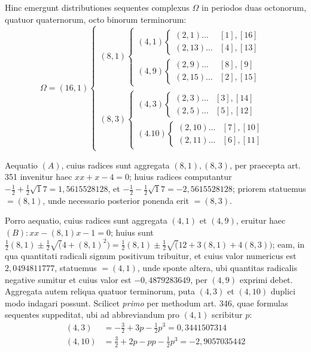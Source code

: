 Hinc emergunt distributiones sequentes complexus \(\Omega\) in periodos duas octonorum, quatuor quaternorum, octo binorum terminorum: {\small\setlength{\arraycolsep}{2pt}\[\Omega=(16,1)\left\{\begin{array}{l}(8,1)\left\{\begin{array}{l}(4,1)\left\{\begin{array}{ll}(2,1)\ldots&[1],[16]\\(2,13)\ldots&[4],[13]\end{array}\right.\\[4pt](4,9)\left\{\begin{array}{ll}(2,9)\ldots&[8],[9]\\(2,15)\ldots&[2],[15]\end{array}\right.\end{array}\right.\\[8pt](8,3)\left\{\begin{array}{l}(4,3)\left\{\begin{array}{ll}(2,3)\ldots&[3],[14]\\(2,5)\ldots&[5],[12]\end{array}\right.\\[4pt](4.10)\left\{\begin{array}{ll}(2,10)\ldots&[7],[10]\\(2,11)\ldots&[6],[11]\end{array}\right.\end{array}\right.\end{array}\right.\]}

Aequatio \((A)\), cuius radices sunt aggregata \((8,1),\allowbreak (8,3)\), per praecepta art. 351 invenitur haec \(xx+x-4=0\); huius radices computantur \(-\frac12+\frac12\surd 17=1{,}5615528128\), et \(-\frac12-\frac12\surd 17=-2{,}5615528128\); priorem statuemus \(=(8,1)\), unde necessario posterior ponenda erit \(=(8,3)\).

Porro aequatio, cuius radices sunt aggregata \((4,1)\) et \((4,9)\), eruitur haec \((B):xx-(8,1)x-1=0\); huius sunt \(\frac12(8,1)\pm\frac12\surd(4+(8,1)^2)=\frac12(8,1)\pm\frac12\surd(12+3(8,1)+4(8,3))\); eam, in qua quantitati radicali signum positivum tribuitur, et cuius valor numericus est \(2{,}0494811777\), statuemus \(=(4,1)\), unde sponte altera, ubi quantitas radicalis negative sumitur et cuius valor est \(-0{,}4879283649\), per \((4,9)\) exprimi debet. Aggregata autem reliqua quatuor terminorum, puta \((4,3)\) et \((4,10)\) duplici modo indagari possunt. Scilicet \textit{primo} per methodum art. 346, quae formulas sequentes suppeditat, ubi ad abbreviandum pro \((4,1)\) scribitur \(p\): \[\begin{aligned}(4,3)&=-\frac32+3p-\frac12p^3=0{,}3441507314\\(4,10)&=\frac32+2p-pp-\frac12p^3=-2{,}9057035442\end{aligned}\]

